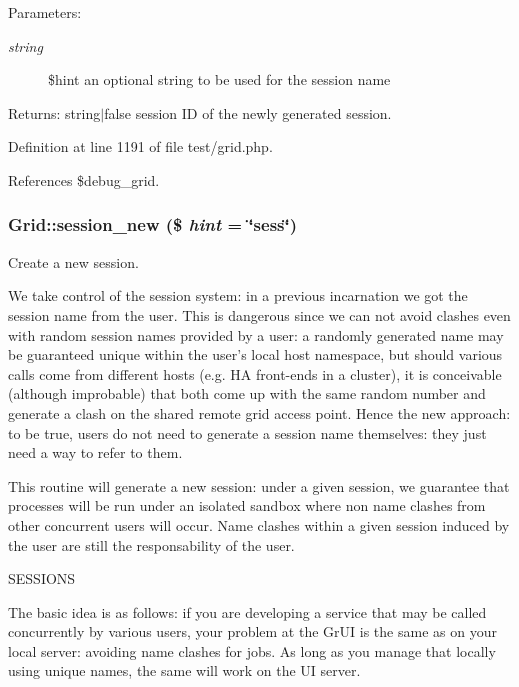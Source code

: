 \begin{Desc}
\item[Parameters:]
\begin{description}
\item[{\em string}]\$hint an optional string to be used for the session name\end{description}
\end{Desc}
\begin{Desc}
\item[Returns:]string$|$false session ID of the newly generated session. \end{Desc}


Definition at line 1191 of file test/grid.php.

References \$debug\_\-grid.
\subsubsection{\setlength{\rightskip}{0pt plus 5cm}Grid::session\_\-new (\$ {\em hint} = \char`\"{}sess\char`\"{})}\label{classGrid_a13}


Create a new session. 

We take control of the session system: in a previous incarnation we got the session name from the user. This is dangerous since we can not avoid clashes even with random session names provided by a user: a randomly generated name may be guaranteed unique within the user's local host namespace, but should various calls come from different hosts (e.g. HA front-ends in a cluster), it is conceivable (although improbable) that both come up with the same random number and generate a clash on the shared remote grid access point. Hence the new approach: to be true, users do not need to generate a session name themselves: they just need a way to refer to them.

This routine will generate a new session: under a given session, we guarantee that processes will be run under an isolated sandbox where non name clashes from other concurrent users will occur. Name clashes within a given session induced by the user are still the responsability of the user.

SESSIONS

The basic idea is as follows: if you are developing a service that may be called concurrently by various users, your problem at the Gr\-UI is the same as on your local server: avoiding name clashes for jobs. As long as you manage that locally using unique names, the same will work on the UI server.

